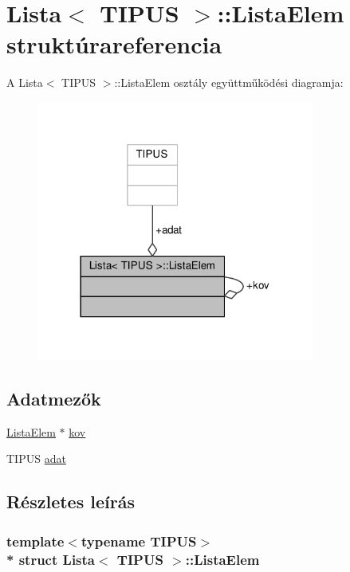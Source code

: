 \hypertarget{structLista_1_1ListaElem}{}\section{Lista$<$ T\+I\+P\+US $>$\+:\+:Lista\+Elem struktúrareferencia}
\label{structLista_1_1ListaElem}


A Lista$<$ T\+I\+P\+US $>$\+:\+:Lista\+Elem osztály együttműködési diagramja\+:\nopagebreak
\begin{figure}[H]
\begin{center}
\leavevmode
\includegraphics[width=258pt]{structLista_1_1ListaElem__coll__graph}
\end{center}
\end{figure}
\subsection*{Adatmezők}
\begin{DoxyCompactItemize}
\item 
\hyperlink{structLista_1_1ListaElem}{Lista\+Elem} $\ast$ \hyperlink{structLista_1_1ListaElem_a01e306c007ad116a02b89daae4003e92}{kov}
\item 
T\+I\+P\+US \hyperlink{structLista_1_1ListaElem_af3ebf30581a3eb36c4de08c2a08cd151}{adat}
\end{DoxyCompactItemize}


\subsection{Részletes leírás}
\subsubsection*{template$<$typename T\+I\+P\+US$>$\\*
struct Lista$<$ T\+I\+P\+U\+S $>$\+::\+Lista\+Elem}



